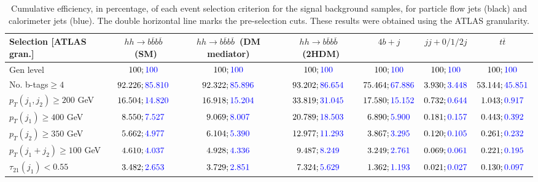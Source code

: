\begin{landscape}
	\begin{table}
		\centering
		\caption{Cumulative efficiency, in percentage, of each event selection criterion for the signal background samples, for particle flow jets (black) and calorimeter jets (blue). The double horizontal line marks the pre-selection cuts. These results were obtained using the ATLAS granularity.}
		\begin{tabular}{lcccccc}
			\toprule 
			\textbf{Selection [ATLAS gran.]} & $hh\rightarrow b\overline{b}b\overline{b}$~(SM) & $hh\rightarrow b\overline{b}b\overline{b}$~(DM mediator) & $hh\rightarrow b\overline{b}b\overline{b}$~(2HDM) & $4b+j$  & $jj+0/1/2 j$ & $t\overline{t}$ \\
			\midrule
			Gen level & $100;\textcolor{blue}{100}$ & $100;\textcolor{blue}{100}$ &$100;\textcolor{blue}{100}$& $100;\textcolor{blue}{100}$& $100;\textcolor{blue}{100}$& $100;\textcolor{blue}{100}$ \\
			\rowcolor{black!7}No. b-tags$\geq 4$&$92.226;\textcolor{blue}{85.810}$&$92.322;\textcolor{blue}{85.896}$&$93.202;\textcolor{blue}{86.654}$&$75.464;\textcolor{blue}{67.886}$&$3.930;\textcolor{blue}{3.448}$&$53.144;\textcolor{blue}{45.851}$\\
			$p_T(j_1,j_2)\geq200$ GeV & $16.504;\textcolor{blue}{14.820}$ & $16.918;\textcolor{blue}{15.204}$&$33.819;\textcolor{blue}{31.045}$ &$17.580;\textcolor{blue}{15.152}$&$0.732;\textcolor{blue}{0.644}$&$1.043;\textcolor{blue}{0.917}$\\
			\midrule \midrule
			\rowcolor{black!7}$p_T(j_1)\geq 400$ GeV & $8.550;\textcolor{blue}{7.527}$ &$9.069;\textcolor{blue}{8.007}$  &$20.789;\textcolor{blue}{18.503}$&$6.890;\textcolor{blue}{5.900}$&$0.181;\textcolor{blue}{0.157}$&$0.443;\textcolor{blue}{0.392}$\\ 
			$p_T(j_2)\geq 350$ GeV & $5.662;\textcolor{blue}{4.977}$& $6.104;\textcolor{blue}{5.390}$&$12.977;\textcolor{blue}{11.293}$&$3.867;\textcolor{blue}{3.295}$&$0.120;\textcolor{blue}{0.105}$&$0.261;\textcolor{blue}{0.232}$\\
			\rowcolor{black!7}$p_T(j_1+j_2)\geq 100$ GeV &$4.610;\textcolor{blue}{4.037}$ & $4.928;\textcolor{blue}{4.336}$ &$9.487;\textcolor{blue}{8.249}$&$3.249;\textcolor{blue}{2.761}$&$0.069;\textcolor{blue}{0.061}$&$0.221;\textcolor{blue}{0.195}$\\
			$\tau_{21}(j_1)<0.55$ & $3.482;\textcolor{blue}{2.653}$& $3.729;\textcolor{blue}{2.851}$&$7.324;\textcolor{blue}{5.629}$&$1.362;\textcolor{blue}{1.193}$&$0.021;\textcolor{blue}{0.027}$&$0.130;\textcolor{blue}{0.097}$\\

\end{tabular}
\end{table}
\end{landscape}
